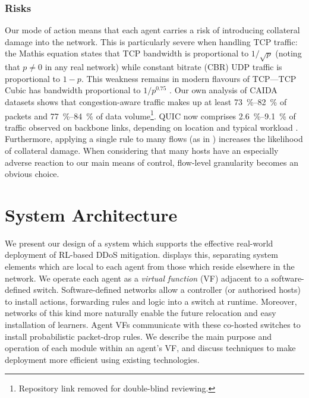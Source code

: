 \documentclass[10pt, times, conference, letterpaper]{IEEEtran}
\begin{document}
\subsubsection{Risks}
Our mode of action means that each agent carries a risk of introducing collateral damage into the network.
This is particularly severe when handling TCP traffic: the Mathis equation \cite{DBLP:journals/ccr/MathisSMO97} states that TCP bandwidth is proportional to $1/\sqrt{p}$ (noting that $p\ne0$ in any real network) while constant bitrate (CBR) UDP traffic is proportional to $1 - p$.
This weakness remains in modern flavours of TCP---TCP Cubic has bandwidth proportional to $1/p^{0.75}$ \cite{rfc8312}.
Our own analysis of CAIDA datasets \cite{caida-2018-passive} shows that congestion-aware traffic makes up at least \SIrange{73}{82}{\percent} of packets and \SIrange{77}{84}{\percent} of data volume\footnote{Repository link removed for double-blind reviewing.}.
QUIC now comprises \SIrange{2.6}{9.1}{\percent} of traffic observed on backbone links, depending on location and typical workload \cite{DBLP:conf/pam/RuthPDH18}.
Furthermore, applying a single rule to many flows (as in \textcite{DBLP:journals/eaai/MalialisK15}) increases the likelihood of collateral damage.
When considering that many hosts have an especially adverse reaction to our main means of control, flow-level granularity becomes an obvious choice.

\section{System Architecture}\label{sec:system-architecture}

We present our design of a system which supports the effective real-world deployment of RL-based DDoS mitigation.
 displays this, separating system elements which are local to each agent from those which reside elsewhere in the network.
We operate each agent as a \emph{virtual function} (VF) adjacent to a software-defined switch.
Software-defined networks allow a controller (or authorised hosts) to install actions, forwarding rules and logic into a switch at runtime.
Moreover, networks of this kind more naturally enable the future relocation and easy installation of learners.
Agent VFs communicate with these co-hosted switches to install probabilistic packet-drop rules.
We describe the main purpose and operation of each module within an agent's VF, and discuss techniques to make deployment more efficient using existing technologies.
\end{document}
